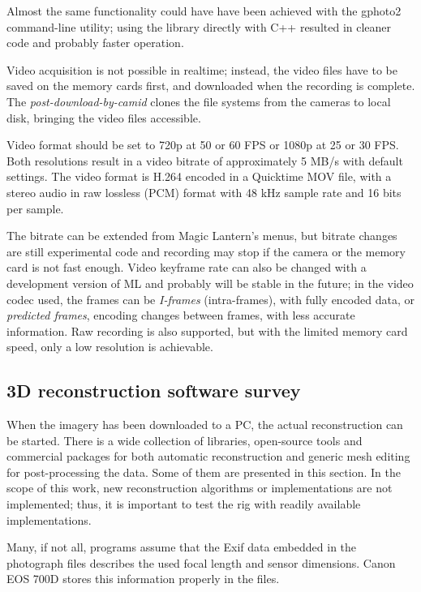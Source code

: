 Almost the same functionality could have have been achieved with the gphoto2 command-line utility; using the library directly with C++ resulted in cleaner code and probably faster operation.

Video acquisition is not possible in realtime; instead, the video files have to be saved on the memory cards first, and downloaded when the recording is complete.
The \emph{post-download-by-camid} clones the file systems from the cameras to local disk, bringing the video files accessible.

Video format should be set to 720p at 50 or 60 FPS or 1080p at 25 or 30 FPS.
Both resolutions result in a video bitrate of approximately 5 MB/s with default settings.
The video format is H.264 encoded in a Quicktime MOV file, with a stereo audio in raw lossless (PCM) format with 48 kHz sample rate and 16 bits per sample.

The bitrate can be extended from Magic Lantern's menus, but bitrate changes are still experimental code and recording may stop if the camera or the memory card is not fast enough.
Video keyframe rate can also be changed with a development version of ML and probably will be stable in the future;
in the video codec used, the frames can be \emph{I-frames} (intra-frames), with fully encoded data, or \emph{predicted frames}, encoding changes between frames, with less accurate information.
Raw recording is also supported, but with the limited memory card speed, only a low resolution is achievable.


\subsection{3D reconstruction software survey} %


When the imagery has been downloaded to a PC, the actual reconstruction can be started.
There is a wide collection of libraries, open-source tools and commercial packages for both automatic reconstruction and generic mesh editing for post-processing the data.
Some of them are presented in this section.
In the scope of this work, new reconstruction algorithms or implementations are not implemented;
thus, it is important to test the rig with readily available implementations.

Many, if not all, programs assume that the Exif data embedded in the photograph files describes the used focal length and sensor dimensions.
Canon EOS 700D stores this information properly in the files.

